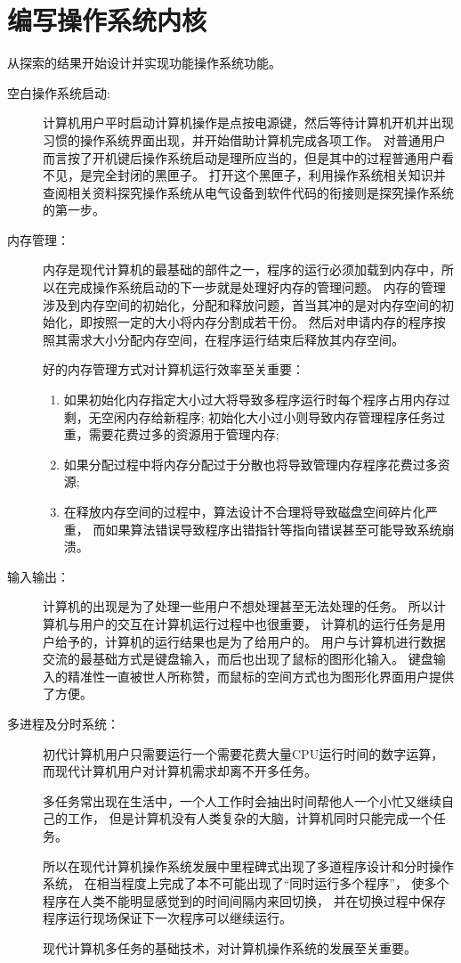 \section{编写操作系统内核}
从探索的结果开始设计并实现功能操作系统功能。
\begin{description}
    \item[空白操作系统启动:]
    计算机用户平时启动计算机操作是点按电源键，然后等待计算机开机并出现习惯的操作系统界面出现，并开始借助计算机完成各项工作。
    对普通用户而言按了开机键后操作系统启动是理所应当的，但是其中的过程普通用户看不见，是完全封闭的黑匣子。
    打开这个黑匣子，利用操作系统相关知识并查阅相关资料探究操作系统从电气设备到软件代码的衔接则是探究操作系统的第一步。

    \item [内存管理：]
    内存是现代计算机的最基础的部件之一，程序的运行必须加载到内存中，所以在完成操作系统启动的下一步就是处理好内存的管理问题。
    内存的管理涉及到内存空间的初始化，分配和释放问题，首当其冲的是对内存空间的初始化，即按照一定的大小将内存分割成若干份。
    然后对申请内存的程序按照其需求大小分配内存空间，在程序运行结束后释放其内存空间。
    
    好的内存管理方式对计算机运行效率至关重要：
    \begin{enumerate}
        \item 如果初始化内存指定大小过大将导致多程序运行时每个程序占用内存过剩，无空闲内存给新程序;
    初始化大小过小则导致内存管理程序任务过重，需要花费过多的资源用于管理内存;
        \item 如果分配过程中将内存分配过于分散也将导致管理内存程序花费过多资源;
        \item 在释放内存空间的过程中，算法设计不合理将导致磁盘空间碎片化严重，
        而如果算法错误导致程序出错指针等指向错误甚至可能导致系统崩溃。
    \end{enumerate}

    \item [输入输出：]
    计算机的出现是为了处理一些用户不想处理甚至无法处理的任务。
    所以计算机与用户的交互在计算机运行过程中也很重要，
        计算机的运行任务是用户给予的，计算机的运行结果也是为了给用户的。
    用户与计算机进行数据交流的最基础方式是键盘输入，而后也出现了鼠标的图形化输入。
    键盘输入的精准性一直被世人所称赞，而鼠标的空间方式也为图形化界面用户提供了方便。    

    \item [多进程及分时系统：]
    初代计算机用户只需要运行一个需要花费大量CPU运行时间的数字运算，
    而现代计算机用户对计算机需求却离不开多任务。

    多任务常出现在生活中，一个人工作时会抽出时间帮他人一个小忙又继续自己的工作，
    但是计算机没有人类复杂的大脑，计算机同时只能完成一个任务。

    所以在现代计算机操作系统发展中里程碑式出现了多道程序设计和分时操作系统，
    在相当程度上完成了本不可能出现了“同时运行多个程序”，
    使多个程序在人类不能明显感觉到的时间间隔内来回切换，
    并在切换过程中保存程序运行现场保证下一次程序可以继续运行。

    现代计算机多任务的基础技术，对计算机操作系统的发展至关重要。
\end{description}

